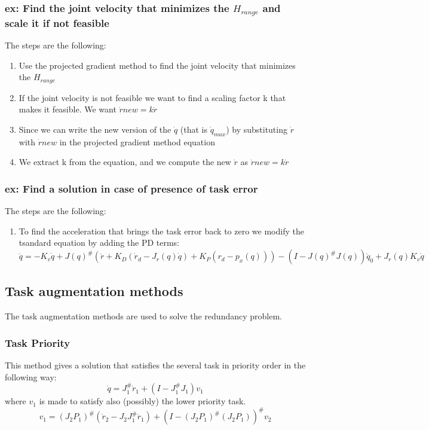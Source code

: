\documentclass[a4paper,12pt]{article}
\begin{document}
\subsubsection{ex: Find the joint velocity that minimizes the $H_{range}$ and scale it if not feasible}
The steps are the following:
\begin{enumerate}
    \item Use the projected gradient method to find the joint
     velocity that minimizes the $H_{range}$
    \item If the joint velocity is not feasible we want to find a 
    scaling factor k that makes it feasible. 
    We want $\dot{r}new = k \dot{r}$
    \item Since we can write the new version of the $\dot{q}$ (that is $\dot{q}_{max}$) by substituting 
    $\dot{r}$ with $\dot{r}new$ in the projected gradient method equation
    \item We extract k from the equation, and we compute the new $\dot{r}$ as $\dot{r}new = k \dot{r}$
\end{enumerate}
\subsubsection{ex: Find a solution in case of presence of task error}
The steps are the following:
\begin{enumerate}
    \item To find the acceleration that brings the 
    task error back to zero we modify the tsandard equation by 
    adding the PD terms:
    $\ddot{q} = -K_v\dot{q} + J(q)^{\#}(\ddot{r} + K_D(\dot{r}_d - J_r(q)\dot{q}) + K_P(r_d - p_x(q))) - (I - J(q)^{\#}J(q))\ddot{q}_0 + J_r(q)K_v\dot{q}$
\end{enumerate}
    \subsection{Task augmentation methods} \label{sec:Task augmentation methods}
The task augmentation methods are used to solve the redundancy problem.
\subsubsection{Task Priority}\label{sec:Task Priority}
This method gives a solution that satisfies the several task in priority order in the following way:
\begin{equation}
    \dot{q} = J_1^\# \dot{r}_1 + (I - J_1^\# J_1)v_1
\end{equation}
where $v_1$ is made to satisfy also (possibly) the lower priority task.
\begin{equation}
    v_1 = (J_2 P_1)^{\#}(\dot{r}_2 - J_2 J_1^\# \dot{r}_1)+(I -( J_2 P_1)^{\#}(J_2P_1))^{\#}v_2
\end{equation}
\end{document}
